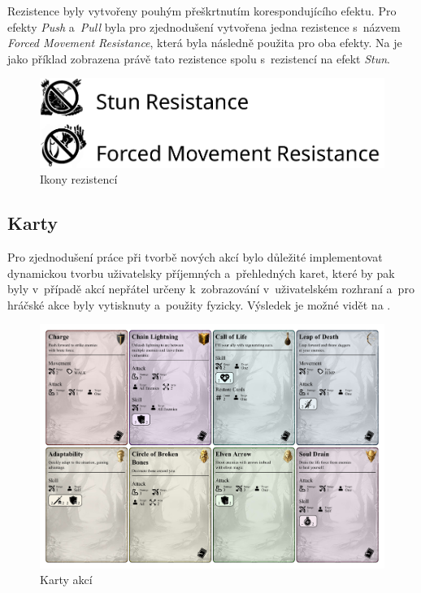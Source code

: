 Rezistence byly vytvořeny pouhým přeškrtnutím korespondujícího efektu. Pro efekty \textit{Push} a~\textit{Pull} byla pro zjednodušení vytvořena jedna rezistence s~názvem \textit{Forced Movement Resistance}, která byla následně použita pro oba efekty. Na  je jako příklad zobrazena právě tato rezistence spolu s~rezistencí na efekt \textit{Stun}.

\begin{figure}[H]
    \centering
    \includegraphics[scale=0.7]{figures/images/resistances.pdf}
    \caption{Ikony rezistencí}
    \label{fig:resistances}
\end{figure}

\subsection{Karty}
\label{subsec:cards}

Pro zjednodušení práce při tvorbě nových akcí bylo důležité implementovat dynamickou tvorbu uživatelsky příjemných a~přehledných karet, které by pak byly v~případě akcí nepřátel určeny k~zobrazování v~uživatelském rozhraní a~pro hráčské akce byly vytisknuty a~použity fyzicky. Výsledek je možné vidět na .

\begin{figure}[H]
    \centering
    \includegraphics[width=\textwidth]{figures/images/cards.pdf}
    \caption{Karty akcí}
    \label{fig:cards}
\end{figure}
\newpage

